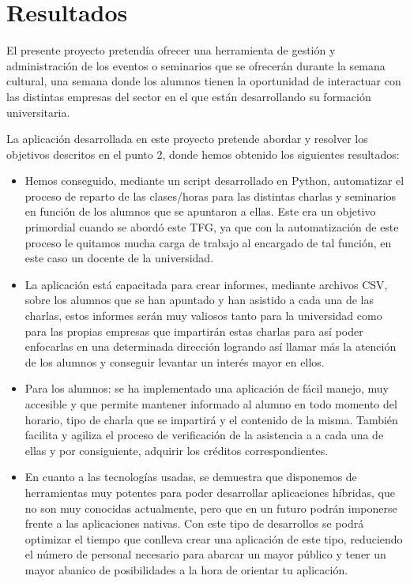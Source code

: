 \documentclass[a4paper, 12pt]{book}
\begin{document}

\cleardoublepage
\chapter{Resultados}

El presente proyecto pretendía ofrecer una herramienta de gestión y administración de los eventos o seminarios que se ofrecerán durante la semana cultural, una semana donde los alumnos tienen la oportunidad de interactuar con las distintas empresas del sector en el que están desarrollando su formación universitaria.

La aplicación desarrollada en este proyecto pretende abordar y resolver los objetivos descritos en el punto 2, donde hemos obtenido los siguientes resultados:

\begin{itemize}
  \item Hemos conseguido, mediante un script desarrollado en Python, automatizar el proceso de reparto de las clases/horas para las distintas charlas y seminarios en función de los alumnos que se apuntaron a ellas. Este era un objetivo primordial cuando se abordó este TFG, ya que con la automatización de este proceso le quitamos mucha carga de trabajo al encargado de tal función, en este caso un docente de la universidad.
  
  \item La aplicación está capacitada para crear informes, mediante archivos CSV, sobre los alumnos que se han apuntado y han asistido a cada una de las charlas, estos informes serán muy valiosos tanto para la universidad como para las propias empresas que impartirán estas charlas para así poder enfocarlas en una determinada dirección logrando así llamar más la atención de los alumnos y conseguir levantar un interés mayor en ellos.
   
   \item Para los alumnos: se ha implementado una aplicación de fácil manejo, muy accesible y que permite mantener informado al alumno en todo momento del horario, tipo de charla que se impartirá y el contenido de la misma. También facilita y agiliza el proceso de verificación de la asistencia a a cada una de ellas y por consiguiente, adquirir los créditos correspondientes.
   
   \item En cuanto a las tecnologías usadas, se demuestra que disponemos de herramientas muy potentes para poder desarrollar aplicaciones híbridas, que no son muy conocidas actualmente, pero que en un futuro podrán imponerse frente a las aplicaciones nativas. Con este tipo de desarrollos se podrá optimizar el tiempo que conlleva crear una aplicación de este tipo, reduciendo el número de personal necesario para abarcar un mayor público y tener un mayor abanico de posibilidades a la hora de orientar tu aplicación.
\end{itemize}
\end{document}
